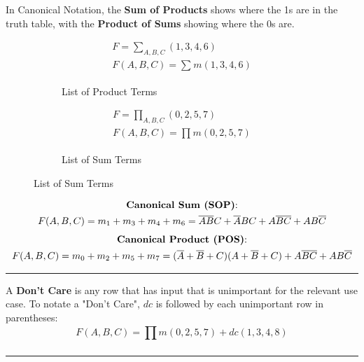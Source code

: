 \documentclass[12pt]{article}
\begin{document}
In Canonical Notation, the \textbf{Sum of Products} shows where the 1s are in the truth table,
with the \textbf{Product of Sums} showing where the 0s are.

\begin{figure}[H]
  \centering
  \begin{subfigure}[H]{0.45\textwidth}
    \centering
    \begin{gather*}
      F = \sum_{A,B,C}^{} (1, 3, 4, 6) \\
      F(A,B,C) = \sum_{}^{} m(1, 3, 4, 6)
    \end{gather*}
    \vspace{-20pt}
    \caption{List of Product Terms}
    \label{fig:listOfProductTerms}
  \end{subfigure}
  \begin{subfigure}[H]{0.45\textwidth}
    \centering
    \begin{gather*}
      F = \prod_{A,B,C}^{} (0, 2, 5, 7) \\
      F(A,B,C) = \prod_{}^{} m(0, 2, 5, 7)
    \end{gather*}
    \vspace{-20pt}
    \caption{List of Sum Terms}
    \label{fig:listOfSumTerms}
  \end{subfigure}
\end{figure}
\begin{gather*}
  \textup{\textbf{Canonical Sum (SOP)}:} \\
  F(A,B,C) = m_1 + m_3 + m_4 + m_6 = \overline{AB}C + \overline{A}BC + A \overline{BC} + AB \overline{C}
\end{gather*}
\begin{gather*}
  \textup{\textbf{Canonical Product (POS)}:} \\
  F(A,B,C) = m_0 + m_2 + m_5 + m_7 = (\overline{A} + \overline{B} + C)(A + \overline{B} + C) + A \overline{BC} + AB \overline{C}
\end{gather*}
\hrule
A \textbf{Don't Care} is any row that has input that is unimportant for the relevant use case.
To notate a "Don't Care", $dc$ is followed by each unimportant row in parentheses:
\begin{equation*}
  F(A,B,C) = \prod_{}^{} m(0, 2, 5, 7) + dc(1, 3, 4, 8)
\end{equation*}
\hrule
\end{document}
